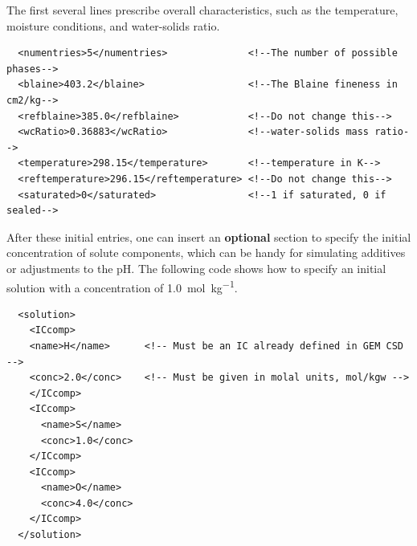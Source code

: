 \documentclass{article}
\begin{document}
The first several lines prescribe overall characteristics, such as the
temperature, moisture conditions, and water-solids ratio.

\scriptsize{
\begin{lstlisting}
  <numentries>5</numentries>              <!--The number of possible phases-->
  <blaine>403.2</blaine>                  <!--The Blaine fineness in cm2/kg-->
  <refblaine>385.0</refblaine>            <!--Do not change this-->
  <wcRatio>0.36883</wcRatio>              <!--water-solids mass ratio-->
  <temperature>298.15</temperature>       <!--temperature in K-->
  <reftemperature>296.15</reftemperature> <!--Do not change this-->
  <saturated>0</saturated>                <!--1 if saturated, 0 if sealed-->
\end{lstlisting}
}

\normalsize{ }

After these initial entries, one can insert an \textbf{optional} section to
specify the initial concentration of solute components, which can be handy for
simulating additives or adjustments to the pH.  The following code shows how
to specify an initial solution with a  concentration of \SI{1.0}{\mol\per\kilogram}.

\scriptsize{
\begin{lstlisting}
  <solution>
    <ICcomp>
    <name>H</name>      <!-- Must be an IC already defined in GEM CSD -->
    <conc>2.0</conc>    <!-- Must be given in molal units, mol/kgw -->
    </ICcomp>
    <ICcomp>
      <name>S</name>
      <conc>1.0</conc>
    </ICcomp>
    <ICcomp>
      <name>O</name>
      <conc>4.0</conc>
    </ICcomp>
  </solution>
\end{lstlisting}
}

\normalsize{ }
\end{document}
